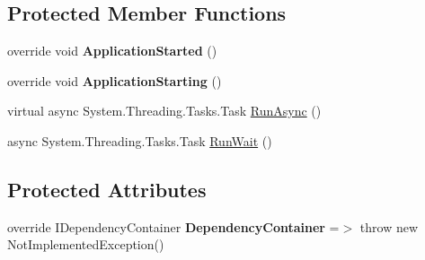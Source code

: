 \subsection*{Protected Member Functions}
\begin{DoxyCompactItemize}
\item 
\mbox{\label{class_t_net_1_1_runtime_1_1_t_n_server___app_a4fccf5ab5cff82778518c168efb4f1c8}} 
override void {\bfseries Application\+Started} ()
\item 
\mbox{\label{class_t_net_1_1_runtime_1_1_t_n_server___app_a2b49dcf63c2dba55b510f3d2768c9b34}} 
override void {\bfseries Application\+Starting} ()
\item 
virtual async System.\+Threading.\+Tasks.\+Task \mbox{\hyperlink{class_t_net_1_1_runtime_1_1_t_n_server___app_a1c66fdfb5ee5d2cd1bcb2100ae85beb4}{Run\+Async}} ()
\item 
async System.\+Threading.\+Tasks.\+Task \mbox{\hyperlink{class_t_net_1_1_runtime_1_1_t_n_server___app_a403a8a434e81c2f9e82cf98961a5dd97}{Run\+Wait}} ()
\end{DoxyCompactItemize}
\subsection*{Protected Attributes}
\begin{DoxyCompactItemize}
\item 
\mbox{\label{class_t_net_1_1_runtime_1_1_t_n_server___app_ab0b9c566096f8095a7e34a21417fd7b2}} 
override I\+Dependency\+Container {\bfseries Dependency\+Container} =$>$ throw new Not\+Implemented\+Exception()
\end{DoxyCompactItemize}
